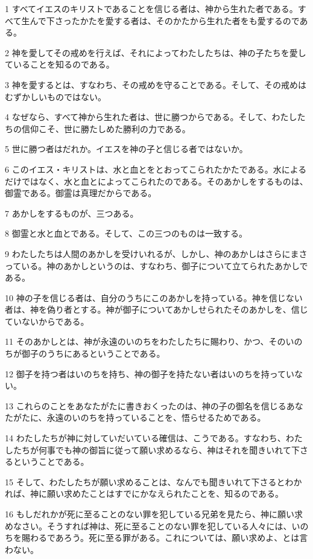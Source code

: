 \par 1 すべてイエスのキリストであることを信じる者は、神から生れた者である。すべて生んで下さったかたを愛する者は、そのかたから生れた者をも愛するのである。
\par 2 神を愛してその戒めを行えば、それによってわたしたちは、神の子たちを愛していることを知るのである。
\par 3 神を愛するとは、すなわち、その戒めを守ることである。そして、その戒めはむずかしいものではない。
\par 4 なぜなら、すべて神から生れた者は、世に勝つからである。そして、わたしたちの信仰こそ、世に勝たしめた勝利の力である。
\par 5 世に勝つ者はだれか。イエスを神の子と信じる者ではないか。
\par 6 このイエス・キリストは、水と血とをとおってこられたかたである。水によるだけではなく、水と血とによってこられたのである。そのあかしをするものは、御霊である。御霊は真理だからである。
\par 7 あかしをするものが、三つある。
\par 8 御霊と水と血とである。そして、この三つのものは一致する。
\par 9 わたしたちは人間のあかしを受けいれるが、しかし、神のあかしはさらにまさっている。神のあかしというのは、すなわち、御子について立てられたあかしである。
\par 10 神の子を信じる者は、自分のうちにこのあかしを持っている。神を信じない者は、神を偽り者とする。神が御子についてあかしせられたそのあかしを、信じていないからである。
\par 11 そのあかしとは、神が永遠のいのちをわたしたちに賜わり、かつ、そのいのちが御子のうちにあるということである。
\par 12 御子を持つ者はいのちを持ち、神の御子を持たない者はいのちを持っていない。
\par 13 これらのことをあなたがたに書きおくったのは、神の子の御名を信じるあなたがたに、永遠のいのちを持っていることを、悟らせるためである。
\par 14 わたしたちが神に対していだいている確信は、こうである。すなわち、わたしたちが何事でも神の御旨に従って願い求めるなら、神はそれを聞きいれて下さるということである。
\par 15 そして、わたしたちが願い求めることは、なんでも聞きいれて下さるとわかれば、神に願い求めたことはすでにかなえられたことを、知るのである。
\par 16 もしだれかが死に至ることのない罪を犯している兄弟を見たら、神に願い求めなさい。そうすれば神は、死に至ることのない罪を犯している人々には、いのちを賜わるであろう。死に至る罪がある。これについては、願い求めよ、とは言わない。
